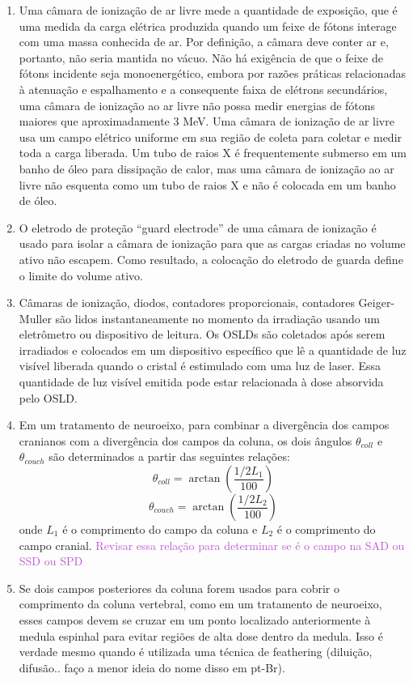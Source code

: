 \documentclass[11pt,a4paper]{article}
\begin{document}
\begin{enumerate}
        \item Uma câmara de ionização de ar livre mede a quantidade de exposição, que é uma medida da carga elétrica produzida quando um feixe de fótons interage com uma massa conhecida de ar. Por definição, a câmara deve conter ar e, portanto, não seria mantida no vácuo. Não há exigência de que o feixe de fótons incidente seja monoenergético, embora por razões práticas relacionadas à atenuação e espalhamento e a consequente faixa de elétrons secundários, uma câmara de ionização ao ar livre não possa medir energias de fótons maiores que aproximadamente 3 MeV. Uma câmara de ionização de ar livre usa um campo elétrico uniforme em sua região de coleta para coletar e medir toda a carga liberada. Um tubo de raios X é frequentemente submerso em um banho de óleo para dissipação de calor, mas uma câmara de ionização ao ar livre não esquenta como um tubo de raios X e não é colocada em um banho de óleo.

        \item O eletrodo de proteção ``guard electrode'' de uma câmara de ionização é usado para isolar a câmara de ionização para que as cargas criadas no volume ativo não escapem. Como resultado, a colocação do eletrodo de guarda define o limite do volume ativo.

        \item Câmaras de ionização, diodos, contadores proporcionais, contadores Geiger-Muller são lidos instantaneamente no momento da irradiação usando um eletrômetro ou dispositivo de leitura. Os OSLDs são coletados após serem irradiados e colocados em um dispositivo específico que lê a quantidade de luz visível liberada quando o cristal é estimulado com uma luz de laser. Essa quantidade de luz visível emitida pode estar relacionada à dose absorvida pelo OSLD.

        \item Em um tratamento de neuroeixo, para combinar a divergência dos campos cranianos com a divergência dos campos da coluna, os dois ângulos $\theta_{coll}$ e $\theta_{couch}$ são determinados a partir das seguintes relações: $$\theta_{coll} = \arctan \left(\frac{1/2 L_1}{100}\right)$$  $$\theta_{couch} = \arctan \left(\frac{1/2 L_2}{100}\right)$$ onde $L_1$ é o comprimento do campo da coluna e $L_2$ é o comprimento do campo cranial. \textcolor{MediumOrchid}{Revisar essa relação para determinar se é o campo na SAD ou SSD ou SPD}

        \item Se dois campos posteriores da coluna forem usados para cobrir o comprimento da coluna vertebral, como em um tratamento de neuroeixo, esses campos devem se cruzar em um ponto localizado anteriormente à medula espinhal para evitar regiões de alta dose dentro da medula. Isso é verdade mesmo quando é utilizada uma técnica de feathering (diluição, difusão.. faço a menor ideia do nome disso em pt-Br).
        

\end{enumerate}
\end{document}
